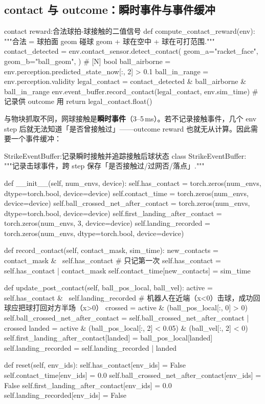 \subsection{contact 与 outcome：瞬时事件与事件缓冲}

\begin{codebox}[Python]{contact reward:合法球拍-球接触的二值信号}
def compute_contact_reward(env):
    """合法 = 球拍面 geom 碰球 geom + 球在空中 + 球在可打范围."""
    contact_detected = env.contact_sensor.detect_contact(
        geom_a="racket_face", geom_b="ball_geom",
    )                                                  # [N] bool
    ball_airborne = env.perception.predicted_state_now[:, 2] > 0.1
    ball_in_range = env.perception.validity
    legal_contact = contact_detected & ball_airborne & ball_in_range
    env.event_buffer.record_contact(legal_contact, env.sim_time)  # 记录供 outcome 用
    return legal_contact.float()
\end{codebox}

与物块抓取不同，网球接触是\textbf{瞬时事件}（3--5\,ms）。若不记录接触事件，几个 env step 后就无法知道「是否曾接触过」——outcome reward 也就无从计算。因此需要一个事件缓冲：

\begin{codebox}[Python]{StrikeEventBuffer:记录瞬时接触并追踪接触后球状态}
class StrikeEventBuffer:
    """记录击球事件，跨 step 保存「是否接触过/过网否/落点」."""

    def __init__(self, num_envs, device):
        self.has_contact = torch.zeros(num_envs, dtype=torch.bool, device=device)
        self.contact_time = torch.zeros(num_envs, device=device)
        self.ball_crossed_net_after_contact = torch.zeros(num_envs, dtype=torch.bool, device=device)
        self.first_landing_after_contact = torch.zeros(num_envs, 3, device=device)
        self.landing_recorded = torch.zeros(num_envs, dtype=torch.bool, device=device)

    def record_contact(self, contact_mask, sim_time):
        new_contacts = contact_mask & ~self.has_contact   # 只记第一次
        self.has_contact = self.has_contact | contact_mask
        self.contact_time[new_contacts] = sim_time

    def update_post_contact(self, ball_pos_local, ball_vel):
        active = self.has_contact & ~self.landing_recorded
        # 机器人在近端（x<0）击球，成功回球应把球打回对方半场（x>0）
        crossed = active & (ball_pos_local[:, 0] > 0)
        self.ball_crossed_net_after_contact = self.ball_crossed_net_after_contact | crossed
        landed = active & (ball_pos_local[:, 2] < 0.05) & (ball_vel[:, 2] < 0)
        self.first_landing_after_contact[landed] = ball_pos_local[landed]
        self.landing_recorded = self.landing_recorded | landed

    def reset(self, env_ids):
        self.has_contact[env_ids] = False
        self.contact_time[env_ids] = 0.0
        self.ball_crossed_net_after_contact[env_ids] = False
        self.first_landing_after_contact[env_ids] = 0.0
        self.landing_recorded[env_ids] = False
\end{codebox}

